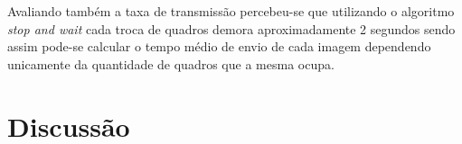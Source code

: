 \documentclass[
article,			%
12pt,				%
oneside,			%
a4paper,			%
english,			%
brazil,				%
sumario=tradicional
]{abntex2}
\begin{document}
Avaliando também a taxa de transmissão percebeu-se que utilizando o algoritmo \textit{stop and wait} cada troca de quadros demora aproximadamente 2 segundos sendo assim pode-se calcular o tempo médio de envio de cada imagem dependendo unicamente da quantidade de quadros que a mesma ocupa.

\cleardoublepage

\section{Discussão}


\postextual

\cleardoublepage

\end{document}
